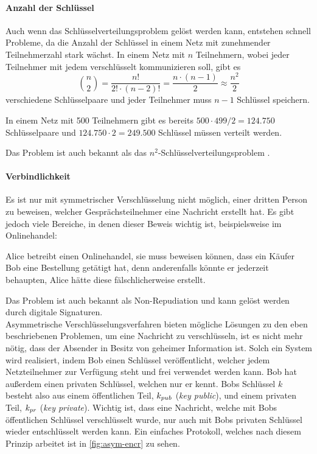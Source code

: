 \paragraph{Anzahl der Schlüssel}
Auch wenn das Schlüsselverteilungsproblem gelöst werden kann, entstehen
schnell Probleme, da die Anzahl der Schlüssel in einem
Netz mit zunehmender Teilnehmerzahl stark wächst. In einem Netz mit $n$
Teilnehmern, wobei jeder Teilnehmer mit jedem verschlüsselt kommunizieren soll, gibt es
\begin{equation*}
  \binom{n}{2} = \frac{n!}{2! \cdot (n-2)!} = \frac{n\cdot(n-1)}{2} \approx \frac{n^2}{2}
\end{equation*}
verschiedene Schlüsselpaare und jeder Teilnehmer muss $n-1$ Schlüssel speichern.
\begin{example}
  In einem Netz mit 500 Teilnehmern gibt es bereits $500 \cdot 499 / 2 = 124.750$ Schlüsselpaare
  und $124.750 \cdot 2 = 249.500$ Schlüssel müssen verteilt werden.
\end{example}
\noindent
Das Problem ist auch bekannt als das
$n^2$-Schlüsselverteilungsproblem \parencite[334-335]{BOOK:crypto}.

\paragraph{Verbindlichkeit}
Es ist nur mit symmetrischer Verschlüsselung nicht möglich, einer dritten Person
zu beweisen, welcher Gesprächsteilnehmer eine Nachricht erstellt hat.
Es gibt jedoch viele Bereiche, in denen dieser Beweis wichtig ist, beispielsweise
im Onlinehandel:
\begin{example}
  Alice betreibt einen Onlinehandel, sie muss beweisen können, dass ein
  Käufer Bob eine Bestellung getätigt hat,
  denn anderenfalls könnte er jederzeit behaupten,
  Alice hätte diese fälschlicherweise erstellt.
\end{example}
\noindent
Das Problem ist auch bekannt als Non-Repudiation \parencite{SITE:nonrepudiation}
und kann gelöst werden durch digitale Signaturen.\\

\noindent
Asymmetrische Verschlüsselungsverfahren bieten mögliche Lösungen zu den eben
beschriebenen Problemen, um eine Nachricht zu verschlüsseln, ist es nicht mehr nötig,
dass der Absender in Besitz von geheimer Information ist. Solch ein System wird
realisiert, indem Bob einen Schlüssel veröffentlicht,
welcher jedem Netzteilnehmer
zur Verfügung steht und frei verwendet werden kann.
Bob hat außerdem einen privaten Schlüssel, welchen nur er kennt.
Bobs Schlüssel $k$ besteht also aus einem öffentlichen Teil, $k_{pub}{}$ (\textit{key public}),
und einem privaten Teil, $k_{pr}{}$ (\textit{key private}). Wichtig ist, dass eine Nachricht,
welche mit Bobs öffentlichen Schlüssel verschlüsselt wurde, nur auch mit Bobs privaten
Schlüssel wieder entschlüsselt werden kann. Ein einfaches Protokoll,
welches nach diesem Prinzip arbeitet ist in \autoref{fig:asym-encr} zu sehen.

